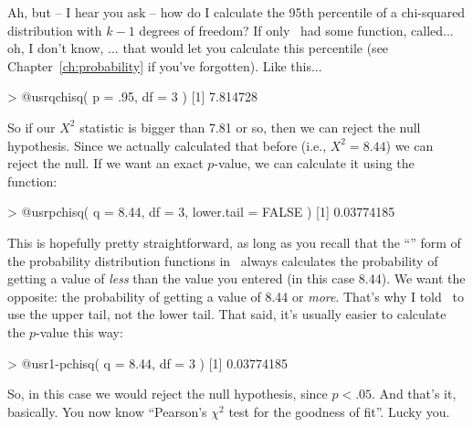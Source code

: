 Ah, but -- I hear you ask -- how do I calculate the 95th percentile of a chi-squared distribution with $k-1$ degrees of freedom? If only \R\ had some function, called... oh, I don't know,  ... that would let you calculate this percentile (see Chapter~\ref{ch:probability} if you've forgotten). Like this...
\begin{rblock1}
> @usr{qchisq( p = .95, df = 3 )}
[1] 7.814728
\end{rblock1}
So if our $X^2$ statistic is bigger than 7.81 or so, then we can reject the null hypothesis. Since we actually calculated that before (i.e., $X^2 = 8.44$) we can reject the null. If we want an exact $p$-value, we can calculate it using the  function:
\begin{rblock1}
> @usr{pchisq( q = 8.44, df = 3, lower.tail = FALSE )}
[1] 0.03774185
\end{rblock1}
This is hopefully pretty straightforward, as long as you recall that the ``'' form of the probability distribution functions in \R\ always calculates the probability of getting a value of {\it less} than the value you entered (in this case 8.44). We want the opposite: the probability of getting a value of 8.44 or {\it more}. That's why I told \R\ to use the upper tail, not the lower tail. That said, it's usually easier to calculate the $p$-value this way:
\begin{rblock1}
> @usr{1-pchisq( q = 8.44, df = 3 )}
[1] 0.03774185
\end{rblock1}
So, in this case we would reject the null hypothesis, since $p < .05$.  And that's it, basically. You now know ``Pearson's $\chi^2$ test for the goodness of fit''. Lucky you.



